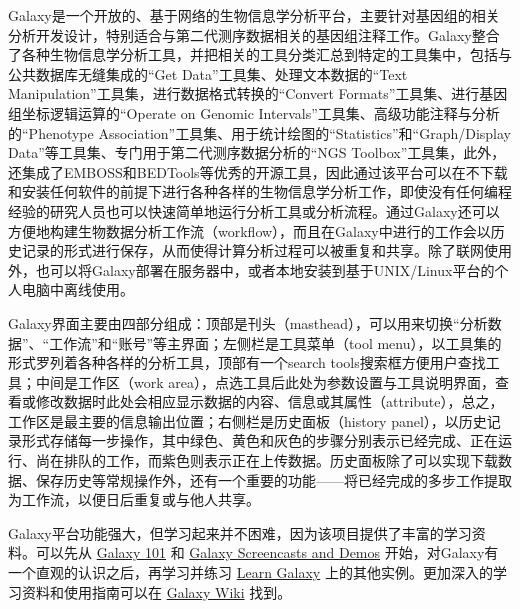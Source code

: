Galaxy是一个开放的、基于网络的生物信息学分析平台，主要针对基因组的相关分析开发设计，特别适合与第二代测序数据相关的基因组注释工作。Galaxy整合了各种生物信息学分析工具，并把相关的工具分类汇总到特定的工具集中，包括与公共数据库无缝集成的“Get Data”工具集、处理文本数据的“Text Manipulation”工具集，进行数据格式转换的“Convert Formats”工具集、进行基因组坐标逻辑运算的“Operate on Genomic Intervals”工具集、高级功能注释与分析的“Phenotype Association”工具集、用于统计绘图的“Statistics”和“Graph/Display Data”等工具集、专门用于第二代测序数据分析的“NGS Toolbox”工具集，此外，还集成了EMBOSS和BEDTools等优秀的开源工具，因此通过该平台可以在不下载和安装任何软件的前提下进行各种各样的生物信息学分析工作，即使没有任何编程经验的研究人员也可以快速简单地运行分析工具或分析流程。通过Galaxy还可以方便地构建生物数据分析工作流（workflow），而且在Galaxy中进行的工作会以历史记录的形式进行保存，从而使得计算分析过程可以被重复和共享。除了联网使用外，也可以将Galaxy部署在服务器中，或者本地安装到基于UNIX/Linux平台的个人电脑中离线使用。

Galaxy界面主要由四部分组成：顶部是刊头（masthead），可以用来切换“分析数据”、“工作流”和“账号”等主界面；左侧栏是工具菜单（tool menu），以工具集的形式罗列着各种各样的分析工具，顶部有一个search tools搜索框方便用户查找工具；中间是工作区（work area），点选工具后此处为参数设置与工具说明界面，查看或修改数据时此处会相应显示数据的内容、信息或其属性（attribute），总之，工作区是最主要的信息输出位置；右侧栏是历史面板（history panel），以历史记录形式存储每一步操作，其中绿色、黄色和灰色的步骤分别表示已经完成、正在运行、尚在排队的工作，而紫色则表示正在上传数据。历史面板除了可以实现下载数据、保存历史等常规操作外，还有一个重要的功能——将已经完成的多步工作提取为工作流，以便日后重复或与他人共享。

Galaxy平台功能强大，但学习起来并不困难，因为该项目提供了丰富的学习资料。可以先从 \href{http://main.g2.bx.psu.edu/galaxy101}{Galaxy 101} 和 \href{http://wiki.galaxyproject.org/Learn/Screencasts}{Galaxy Screencasts and Demos} 开始，对Galaxy有一个直观的认识之后，再学习并练习 \href{http://wiki.galaxyproject.org/Learn}{Learn Galaxy} 上的其他实例。更加深入的学习资料和使用指南可以在 \href{http://wiki.galaxyproject.org/FrontPage}{Galaxy Wiki} 找到。

